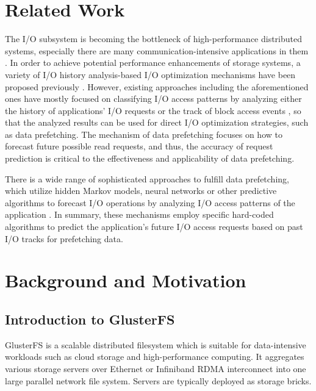 \documentclass[conference]{IEEEtran}
\begin{document}
\section{Related Work}
The I/O subsystem is becoming the bottleneck of high-performance distributed systems, 
especially there are many communication-intensive applications in them \cite{Related_Network_I/O_load_based}.
In order to achieve potential performance enhancements of storage systems, 
a variety of I/O history analysis-based I/O optimization mechanisms have been proposed previously 
\cite{Related_Multi_Layer_Event_Trace_Analysis} \cite{Related_Towards_an_I/O_tracing_framework_taxonomy} \cite{Related_DiskSeen} \cite{A_Prefetching_Scheme_Related} \cite{Scalable_IO_Tracing_Related}.
However, existing approaches including the aforementioned ones have mostly focused on classifying I/O access patterns by analyzing either the history of applications’ I/O requests
\cite{Parallel_IO_Prefetching_Related} \cite{Learning_To_Classify_Related}
or the track of block access events \cite{Related_DiskSeen} \cite{A_Prefetching_Scheme_Related}, 
so that the analyzed results can be used for direct I/O optimization strategies, such as data prefetching.
The mechanism of data prefetching focuses on how to forecast future possible read requests, and thus, 
the accuracy of request prediction is critical to the effectiveness and applicability of data prefetching.

There is a wide range of sophisticated approaches to fulfill data prefetching, 
which utilize hidden Markov models, 
neural networks or other predictive algorithms to forecast I/O operations by analyzing I/O access patterns of the application 
\cite{Parallel_IO_Prefetching_Related} \cite{IO_Acceleration_with_Related} \cite{An_Automatic_Prefetching_Related} \cite{Reducing_File_System_Latency_Related} \cite{Automatic_ARIMA_Related}.
In summary, these mechanisms employ specific hard-coded algorithms to predict the application's future I/O access requests based on past I/O tracks for prefetching data.

\section{Background and Motivation}
\subsection{Introduction to GlusterFS}
GlusterFS is a scalable distributed filesystem which is suitable for data-intensive workloads such as cloud storage and high-performance computing.
It aggregates various storage servers over Ethernet or Infiniband RDMA interconnect into one large parallel network file system.
Servers are typically deployed as storage bricks.
\end{document}
